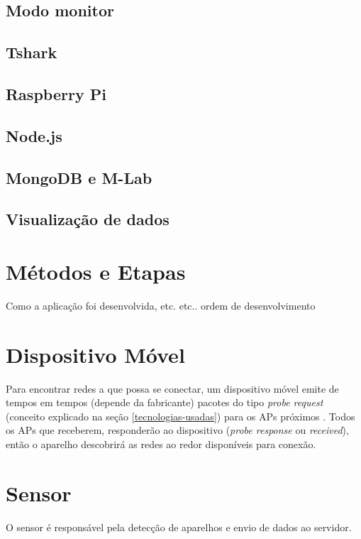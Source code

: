 \subsection{Modo monitor}

\subsection{Tshark}

\subsection{Raspberry Pi}

\subsection{Node.js}

\subsection{MongoDB e M-Lab}

\subsection{Visualização de dados}

\section{Métodos e Etapas}
Como a aplicação foi desenvolvida, etc. etc.. ordem de desenvolvimento


\section{Dispositivo Móvel}
\label{smartphone-probe}
Para encontrar redes a que possa se conectar, um dispositivo móvel emite de tempos em tempos (depende da fabricante) pacotes do tipo \emph{probe request} (conceito explicado na seção \autoref{tecnologias-usadas}) para os APs próximos \cite{Meraki}. Todos os APs que receberem, responderão ao dispositivo (\emph{probe response} ou \emph{received}), então o aparelho descobrirá as redes ao redor disponíveis para conexão.

\section{Sensor}
O sensor é responsável pela detecção de aparelhos e envio de dados ao servidor.

